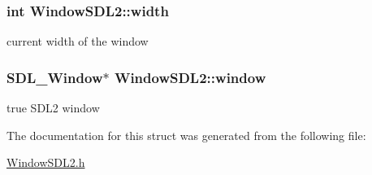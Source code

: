 \subsubsection[{\texorpdfstring{width}{width}}]{\setlength{\rightskip}{0pt plus 5cm}int Window\+S\+D\+L2\+::width}\hypertarget{structWindowSDL2_ade5a776a9e5a2812542ee9b539d66960}{}\label{structWindowSDL2_ade5a776a9e5a2812542ee9b539d66960}
current width of the window 
\subsubsection[{\texorpdfstring{window}{window}}]{\setlength{\rightskip}{0pt plus 5cm}S\+D\+L\+\_\+\+Window$\ast$ Window\+S\+D\+L2\+::window}\hypertarget{structWindowSDL2_ad40f7b0cfcf7dd62f3f10dc47c04a6b3}{}\label{structWindowSDL2_ad40f7b0cfcf7dd62f3f10dc47c04a6b3}
true S\+D\+L2 window 

The documentation for this struct was generated from the following file\+:\begin{DoxyCompactItemize}
\item 
\hyperlink{WindowSDL2_8h}{Window\+S\+D\+L2.\+h}\end{DoxyCompactItemize}
